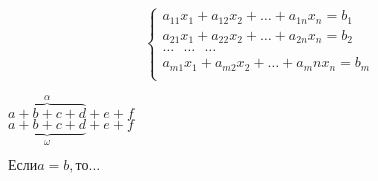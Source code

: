 \documentclass[12pt,4paper]{report}
\begin{document}
\begin{displaymath}
\left\{ \begin{array}{l}
 a_{11}x_1 + a_{12}x_2 + \ldots + a_{1n}x_n = b_1 \\
 a_{21}x_1 + a_{22}x_2 + \ldots + a_{2n}x_n = b_2 \\
 \ldots \ \ \ \ldots \ \ \  \ldots \\
 a_{m1}x_1 + a_{m2}x_2 + \ldots + a_mn x_n = b_m \\                    
  \end{array} \right.
\end{displaymath}

$\overbrace{a + b + c + d}^{\alpha} + e + f$
\\
$\underbrace{a + b + c + d}_{\omega} + e + f$

$\textrm{Если} a = b, \textrm{то} \ldots $
\end{document}
